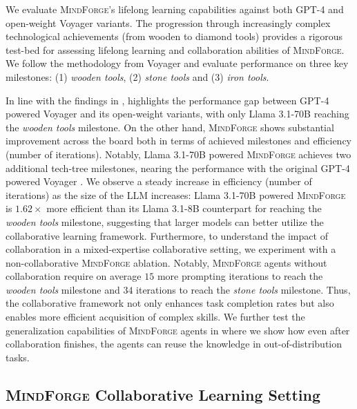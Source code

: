 \documentclass{article}
\newcommand{\collabvoyager}[0]{\mbox{\textsc{MindForge}}\xspace}
\begin{document}
We evaluate \collabvoyager's lifelong learning capabilities against both GPT-4 and open-weight Voyager \citep{wang2023voyager} variants. The progression through increasingly complex technological achievements (from wooden to diamond tools) provides a rigorous test-bed for assessing lifelong learning and collaboration abilities of \collabvoyager. We follow the methodology from Voyager and evaluate performance on three key milestones: (1) \textit{wooden tools}, (2) \textit{stone tools} and (3) \textit{iron tools}.

In line with the findings in ,  highlights the performance gap between GPT-4 powered Voyager and its open-weight variants, with only Llama 3.1-70B \citep{dubey2024llama} reaching the \textit{wooden tools} milestone. On the other hand, \collabvoyager shows substantial improvement across the board both in terms of achieved milestones and efficiency (number of iterations). Notably, Llama 3.1-70B \citep{dubey2024llama} powered \collabvoyager achieves two additional tech-tree milestones, nearing the performance with the original GPT-4 powered Voyager \citep{wang2023voyager}. We observe a steady increase in efficiency (number of iterations) as the size of the LLM increases: Llama 3.1-70B \citep{dubey2024llama} powered \collabvoyager is $1.62\times$ more efficient than its Llama 3.1-8B counterpart for reaching the \textit{wooden tools} milestone, suggesting  that larger models can better utilize the collaborative learning framework. Furthermore, to understand the impact of collaboration in a mixed-expertise collaborative setting, we experiment with a non-collaborative \collabvoyager ablation. Notably, \collabvoyager agents without collaboration require on average $15$ more prompting iterations to reach the \textit{wooden tools} milestone and $34$ iterations to reach the \textit{stone tools} milestone. Thus, the collaborative framework not only enhances task completion rates but also enables more efficient acquisition of complex skills. We further test the generalization capabilities of \collabvoyager agents in  where we show how even after collaboration finishes, the agents can reuse the knowledge in out-of-distribution tasks.

\subsection{\collabvoyager Collaborative Learning Setting}
\label{sec:colab-learning}
\end{document}
